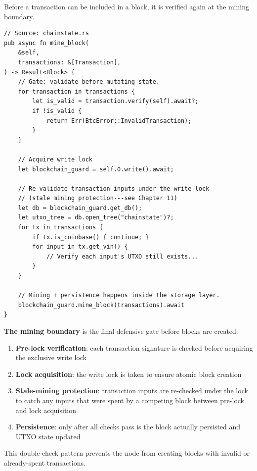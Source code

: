 Before a transaction can be included in a block, it is verified again at the mining boundary.

\begin{listing}[htbp]
\caption{Mining boundary: verify each transaction before mining}
\label{lst:ch09-5-8}
\begin{verbatim}
// Source: chainstate.rs
pub async fn mine_block(
    &self,
    transactions: &[Transaction],
) -> Result<Block> {
    // Gate: validate before mutating state.
    for transaction in transactions {
        let is_valid = transaction.verify(self).await?;
        if !is_valid {
            return Err(BtcError::InvalidTransaction);
        }
    }

    // Acquire write lock
    let blockchain_guard = self.0.write().await;

    // Re-validate transaction inputs under the write lock
    // (stale mining protection---see Chapter 11)
    let db = blockchain_guard.get_db();
    let utxo_tree = db.open_tree("chainstate")?;
    for tx in transactions {
        if tx.is_coinbase() { continue; }
        for input in tx.get_vin() {
            // Verify each input's UTXO still exists...
        }
    }

    // Mining + persistence happens inside the storage layer.
    blockchain_guard.mine_block(transactions).await
}
\end{verbatim}
\end{listing}

\begin{notebox}
\textbf{The mining boundary} is the final defensive gate before blocks are created:
\begin{enumerate}
  \item \textbf{Pre-lock verification}: each transaction signature is checked before acquiring the exclusive write lock
  \item \textbf{Lock acquisition}: the write lock is taken to ensure atomic block creation
  \item \textbf{Stale-mining protection}: transaction inputs are re-checked under the lock to catch any inputs that were spent by a competing block between pre-lock and lock acquisition
  \item \textbf{Persistence}: only after all checks pass is the block actually persisted and UTXO state updated
\end{enumerate}

This double-check pattern prevents the node from creating blocks with invalid or already-spent transactions.
\end{notebox}

